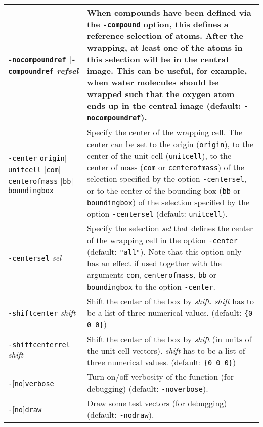 \documentclass[a4paper, DIV12]{scrartcl}
\begin{document}
\begin{tabular}{|p{}|p{}|}
\texttt{-nocompoundref} $|$\texttt{-compoundref} \textit{refsel}
& When compounds have been defined via the \texttt{-compound} option,
this defines a reference selection of atoms. After the wrapping, at
least one of the atoms in this selection will be in the central
image. This can be useful, for example, when water molecules should be
wrapped such that the oxygen atom ends up in the central image
(default: \texttt{-nocompoundref}).
\\ \hline

\texttt{-center} \texttt{origin}$|$\texttt{unitcell}\linebreak
\hspace*{1em}$|$\texttt{com}$|$\texttt{centerofmass}\linebreak 
\hspace*{1em}$|$\texttt{bb}$|$\texttt{boundingbox}
& Specify the center of the wrapping cell. The center can be set to
the origin (\texttt{origin}), to the center of the unit cell
(\texttt{unitcell}), to the center of mass (\texttt{com} or
\texttt{centerofmass}) of the selection specified by the option
\texttt{-centersel}, or to the center of the bounding box (\texttt{bb}
or \texttt{boundingbox}) of the selection specified by the option
\texttt{-centersel} (default: \texttt{unitcell}).
\\ \hline

\texttt{-centersel} \textit{sel}
& Specify the selection \textit{sel} that defines the center of the
wrapping cell in the option \texttt{-center} (default:
\texttt{"all"}). Note that this option only has an effect if used
together with the arguments \texttt{com}, \texttt{centerofmass},
\texttt{bb} or \texttt{boundingbox} to the option \texttt{-center}.
\\ \hline

\texttt{-shiftcenter} \textit{shift}
& Shift the center of the box by \textit{shift}. \textit{shift} has to
be a list of three numerical values. (default: \verb!{0 0 0}!)
\\ \hline

\texttt{-shiftcenterrel} \textit{shift}
& Shift the center of the box by \textit{shift} (in units of
the unit cell vectors). \textit{shift} has to be a list of
three numerical values. (default: \verb!{0 0 0}!)
\\ \hline

\texttt{-}[\texttt{no}]\texttt{verbose}
& Turn on/off verbosity of the function (for debugging) (default:
\texttt{-noverbose}).
\\ \hline

\texttt{-}[\texttt{no}]\texttt{draw}
& Draw some test vectors (for debugging) (default: \texttt{-nodraw}).
\\ \hline

\end{tabular}
\end{document}
